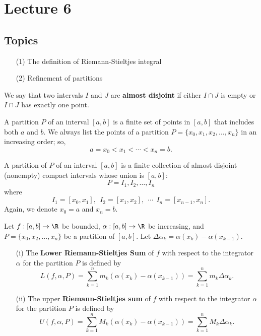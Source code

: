 \section{Lecture 6}
\subsection{Topics}

\begin{enumerate}
    \item[(1)] The definition of Riemann-Stieltjes integral
    \item[(2)] Refinement of partitions 
\end{enumerate}

\begin{definition}
    We say that two intervals \( I  \) and \( J  \) are \textbf{almost disjoint} if either \( I \cap J  \) is empty or \(  I \cap J  \) has exactly one point.
\end{definition}

\begin{definition}[Partition]
    A partition \( P  \) of an interval \( [a,b] \) is a finite set of points in \( [a,b] \) that includes both \( a  \) and \( b  \). We always list the points of a partition \( P = \{  {x}_{0} , {x}_{1}, {x}_{2}, \dots, {x}_{n} \}  \) in an increasing order; so, 
    \[  a = {x}_{0} < {x}_{1}< \cdots < {x}_{n} = b.  \]
\end{definition}

\begin{remark}
    A partition of \( P  \) of an interval \( [a,b] \) is a finite collection of almost disjoint (nonempty) compact intervals whose union is \( [a,b] \): 
    \[  P = {I}_{1}, {I}_{2}, \dots, {I}_{n} \]
    where
    \[  {I}_{1} = [{x}_{0}, {x}_{1}], \ \ {I}_{2} = [{x}_{1}, {x}_{2}], \ \ \cdots \ \ {I}_{n} = [{x}_{n-1}, {x}_{n}]. \]
    Again, we denote \( {x}_{0} = a  \) and \( {x}_{n} = b  \).
\end{remark}

\begin{definition}
    Let \( f: [a,b] \to \R  \) be bounded, \( \alpha : [a,b] \to \R  \) be increasing, and \( P = \{ {x}_{0}, {x}_{2}, \dots, {x}_{n} \}  \) be a partition of \( [a,b] \). Let \( \Delta {\alpha}_{k} = \alpha({x}_{k}) - \alpha({x}_{k-1}) \). 
    \begin{enumerate}
        \item[(i)] The \textbf{Lower Riemann-Stieltjes Sum} of \( f  \) with respect to the integrator \( \alpha \) for the partition \( P  \) is defined by 
            \[  L(f, \alpha, P ) = \sum_{ k=1  }^{ n } {m}_{k} (\alpha({x}_{k}) - \alpha({x}_{k-1})) = \sum_{ k=1  }^{ n } {m}_{k} \Delta {\alpha}_{ k }. \] 
        \item[(ii)] The upper \textbf{Riemann-Stieltjes sum} of \( f  \) with respect to the integrator \( \alpha  \) for the partition \( P  \) is defined by
            \[  U(f, \alpha, P) = \sum_{ k=1  }^{ n } {M}_{k} (\alpha({x}_{k}) - \alpha({x}_{k-1})) = \sum_{ k=1  }^{ n } {M}_{k } \Delta {\alpha}_{k }. \]
    \end{enumerate}
\end{definition}

